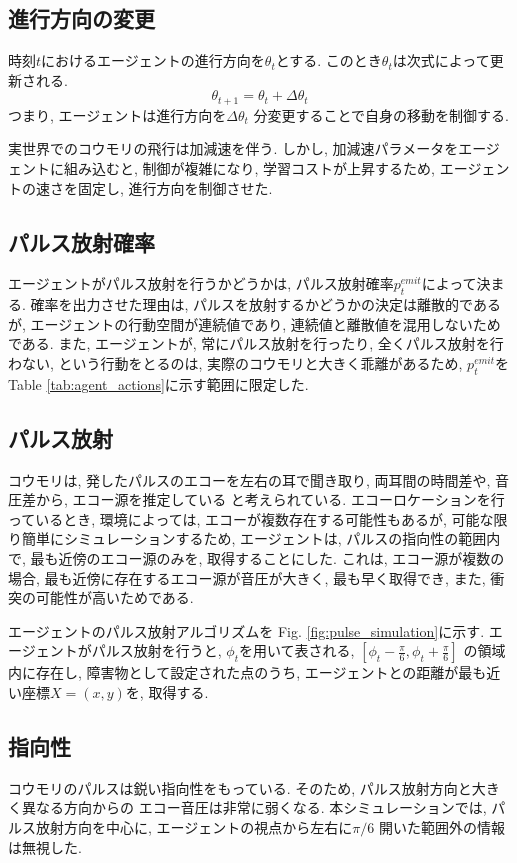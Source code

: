 \documentclass[../main]{subfiles}
\begin{document}
\subsection{進行方向の変更}
時刻$t$におけるエージェントの進行方向を$\theta_t$とする.
このとき$\theta_t$は次式によって更新される.
$$\theta_{t+1}=\theta_t+\Delta\theta_t$$
つまり, エージェントは進行方向を$\Delta\theta_t$
分変更することで自身の移動を制御する.

実世界でのコウモリの飛行は加減速を伴う.
しかし, 加減速パラメータをエージェントに組み込むと, 
制御が複雑になり, 学習コストが上昇するため, 
エージェントの速さを固定し, 進行方向を制御させた.

\subsection{パルス放射確率}
エージェントがパルス放射を行うかどうかは, 
パルス放射確率$p^{emit}_t$によって決まる.
確率を出力させた理由は, 
パルスを放射するかどうかの決定は離散的であるが, 
エージェントの行動空間が連続値であり, 
連続値と離散値を混用しないためである.
また, エージェントが, 
常にパルス放射を行ったり, 全くパルス放射を行わない, 
という行動をとるのは, 実際のコウモリと大きく乖離があるため, 
$p^{emit}_t$を
Table \ref{tab:agent_actions}に示す範囲に限定した.

\subsection{パルス放射}
コウモリは, 発したパルスのエコーを左右の耳で聞き取り, 
両耳間の時間差や, 音圧差から, エコー源を推定している
と考えられている.
エコーロケーションを行っているとき, 
環境によっては, エコーが複数存在する可能性もあるが, 
可能な限り簡単にシミュレーションするため, 
エージェントは, パルスの指向性の範囲内で, 
最も近傍のエコー源のみを, 取得することにした.
これは, エコー源が複数の場合, 
最も近傍に存在するエコー源が音圧が大きく, 
最も早く取得でき, また, 衝突の可能性が高いためである.

エージェントのパルス放射アルゴリズムを
Fig. \ref{fig:pulse_simulation}に示す.
エージェントがパルス放射を行うと, 
$\phi_t$を用いて表される, 
$[\phi_t-\frac{\pi}{6}, \phi_t+\frac{\pi}{6}]$
の領域内に存在し, 障害物として設定された点のうち, 
エージェントとの距離が最も近い座標$X=(x, y)$を, 
取得する.

\subsection{指向性}
コウモリのパルスは鋭い指向性をもっている.
そのため, パルス放射方向と大きく異なる方向からの
エコー音圧は非常に弱くなる.
本シミュレーションでは, パルス放射方向を中心に, 
エージェントの視点から左右に$\pi/6$
開いた範囲外の情報は無視した.
\end{document}

